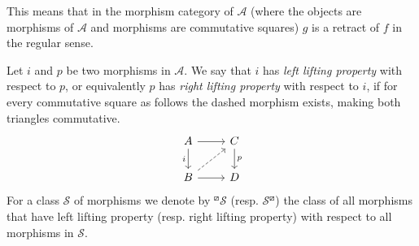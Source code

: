 \documentclass[12pt]{amsart}
\numberwithin{equation}{section}
\theoremstyle{definition}
\newtheorem*{theorem 0*}{Theorem}
\newtheorem*{theorem a*}{Theorem A}
\newtheorem*{theorem b*}{Theorem B}
\numberwithin{diagram}{section}
\begin{document}
This means that in the morphism category of $\mathcal{A}$ (where the objects are morphisms of $\mathcal{A}$ and morphisms are commutative squares) $g$ is a retract of $f$ in the regular sense.

Let $i$ and $p$ be two morphisms in $\mathcal{A}$. We say that $i$ has {\it left lifting property} with respect to $p$, or equivalently $p$ has {\it right lifting property} with respect to $i$, if for every commutative square as follows the dashed morphism exists, making both triangles commutative.
\[\begin{tikzcd}
	A & C \\
	B & D
	\arrow[from=1-1, to=1-2]
	\arrow["i"', from=1-1, to=2-1]
	\arrow["p", from=1-2, to=2-2]
	\arrow[dashed, from=2-1, to=1-2]
	\arrow[from=2-1, to=2-2]
\end{tikzcd}\]
For a class $\mathcal{S}$ of morphisms we denote by ${}^{\boxslash}\mathcal{S}$
(resp. $\mathcal{S}{}^{\boxslash}$) the class of all morphisms that have left lifting property (resp. right lifting property) with respect to all morphisms in $\mathcal{S}$.
\end{document}
